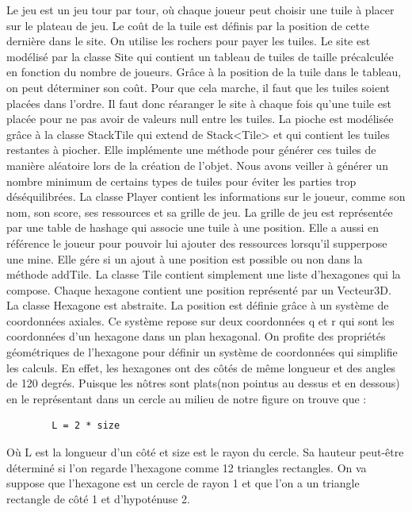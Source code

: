 \documentclass{article}
\begin{document}
    Le jeu est un jeu tour par tour, où chaque joueur peut choisir une tuile à placer sur le plateau de jeu.
    Le coût de la tuile est définis par la position de cette dernière dans le site.
    On utilise les rochers pour payer les tuiles.
    Le site est modélisé par la classe Site qui contient un tableau de tuiles de taille précalculée en fonction du nombre de joueurs.
    Grâce à la position de la tuile dans le tableau, on peut déterminer son coût. Pour que cela marche, il faut que les tuiles soient placées dans l'ordre.
    Il faut donc réaranger le site à chaque fois qu'une tuile est placée pour ne pas avoir de valeurs null entre les tuiles.
    La pioche est modélisée grâce à la classe StackTile qui extend de Stack\textless{}Tile\textgreater{} et qui contient les tuiles restantes à piocher.
    Elle implémente une méthode pour générer ces tuiles de manière aléatoire lors de la création de l'objet.
    Nous avons veiller à générer un nombre minimum de certains types de tuiles pour éviter les parties trop déséquilibrées.
    La classe Player contient les informations sur le joueur, comme son nom, son score, ses ressources et sa grille de jeu.
    La grille de jeu est représentée par une table de hashage qui associe une tuile à une position.
    Elle a aussi en référence le joueur pour pouvoir lui ajouter des ressources lorsqu'il supperpose une mine.
    Elle gére si un ajout à une position est possible ou non dans la méthode addTile.
    La classe Tile contient simplement une liste d'hexagones qui la compose.
    Chaque hexagone contient une position représenté par un Vecteur3D. La classe Hexagone est abstraite.
    La position est définie grâce à un système de coordonnées axiales.
    Ce système repose sur deux coordonnées q et r qui sont les coordonnées d'un hexagone dans un plan hexagonal.
    On profite des propriétés géométriques de l'hexagone pour définir un système de coordonnées qui simplifie les calculs.
    En effet, les hexagones ont des côtés de même longueur et des angles de 120 degrés.
    Puisque les nôtres sont plats(non pointus au dessus et en dessous) en le représentant dans un cercle au milieu de notre figure on trouve que :
    \begin{verbatim}
        L = 2 * size
    \end{verbatim}
    Où L est la longueur d'un côté et size est le rayon du cercle.
    Sa hauteur peut-être déterminé si l'on regarde l'hexagone comme 12 triangles rectangles.
    On va suppose que l'hexagone est un cercle de rayon 1 et que l'on a un triangle rectangle de côté 1 et d'hypoténuse 2.
\end{document}
